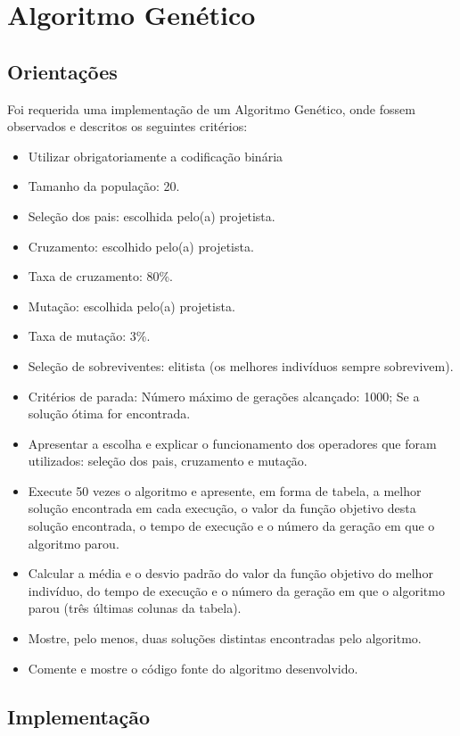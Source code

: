 \section{Algoritmo Genético}

\subsection{Orientações}

Foi requerida uma implementação de um Algoritmo Genético, onde fossem observados e descritos os seguintes critérios:

\begin{itemize}
	\item Utilizar obrigatoriamente a codificação binária
	\item Tamanho da população: 20.
	\item Seleção dos pais: escolhida pelo(a) projetista.
	\item Cruzamento: escolhido pelo(a) projetista.
	\item Taxa de cruzamento: 80\%.
	\item Mutação: escolhida pelo(a) projetista.
	\item Taxa de mutação: 3\%.
	\item Seleção de sobreviventes: elitista (os melhores indivíduos sempre sobrevivem).
	\item Critérios de parada: Número máximo de gerações alcançado: 1000; Se a solução ótima for encontrada.
	
	\item Apresentar a escolha e explicar o funcionamento dos operadores que foram utilizados: seleção dos pais, cruzamento e mutação.
	\item Execute 50 vezes o algoritmo e apresente, em forma de tabela, a	melhor solução encontrada em cada execução, o valor da função objetivo desta solução encontrada, o tempo de execução e o número da geração em que o algoritmo parou.
	\item Calcular a média e o desvio padrão do valor da função objetivo do melhor indivíduo, do tempo de execução e o número da geração em que o algoritmo parou (três últimas colunas da tabela).
	\item Mostre, pelo menos, duas soluções distintas encontradas pelo algoritmo.
	\item Comente e mostre o código fonte do algoritmo desenvolvido.
\end{itemize}

\subsection{Implementação}

